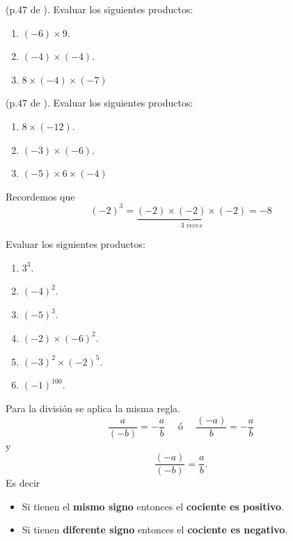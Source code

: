 \begin{ejemplo}
	(p.47 de \cite{Dimensions_Math_7A}). Evaluar los siguientes productos:
			\begin{multicols}{3}
					\begin{enumerate}[label=\Alph*)]
						\item $(-6)\times 9 $.
						\item $(-4)\times (-4)$.
						\item $8\times (-4)\times (-7)$
					\end{enumerate}	
			\end{multicols}
\end{ejemplo}

\begin{exer}
	(p.47 de \cite{Dimensions_Math_7A}). Evaluar los siguientes productos:
	\begin{multicols}{3}
		\begin{enumerate}[label=\Alph*)]
			\item $8\times (-12)$.
			\item $(-3)\times (-6)$.
			\item $(-5)\times 6\times (-4)$
		\end{enumerate}	
	\end{multicols}
\end{exer}

Recordemos que 
\[
		{(-2)}^3=\underbrace{(-2)\times (-2)\times (-2)}_{3 \textit{ veces}} = -8
\]

\begin{exer}
Evaluar los siguientes productos:
	\begin{multicols}{3}
		\begin{enumerate}[label=\Alph*)]
			\item $3^3$.
			\item ${(-4)}^2$.
			\item ${(-5)}^3$.
			\item $(-2)\times {(-6)}^2$.
			\item ${(-3)}^2\times {(-2)}^5$.
			\item ${(-1)}^{100}$.
		\end{enumerate}	
	\end{multicols}
\end{exer}

Para la división se aplica la misma regla. 
\[
\frac{a}{(-b)} = -\frac{a}{b}\quad \text{ ó } \quad \frac{(-a)}{b} = -\frac{a}{b}
\]
y
\[
\frac{(-a)}{(-b)}=\frac{a}{b}.
\]
Es decir
\begin{itemize}
	\item Si tienen el \textbf{mismo signo} entonces el \textbf{cociente es positivo}.
	\item Si tienen \textbf{diferente signo} entonces el \textbf{cociente es negativo}. 
\end{itemize}

